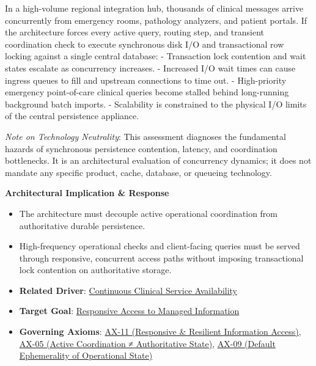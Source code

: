 In a high-volume regional integration hub, thousands of clinical messages arrive concurrently from emergency rooms, pathology analyzers, and patient portals. If the architecture forces every active query, routing step, and transient coordination check to execute synchronous disk I/O and transactional row locking against a single central database:
- Transaction lock contention and wait states escalate as concurrency increases.
- Increased I/O wait times can cause ingress queues to fill and upstream connections to time out.
- High-priority emergency point-of-care clinical queries become stalled behind long-running background batch imports.
- Scalability is constrained to the physical I/O limits of the central persistence appliance.



\emph{Note on Technology Neutrality}: This assessment diagnoses the fundamental hazards of synchronous persistence contention, latency, and coordination bottlenecks. It is an architectural evaluation of concurrency dynamics; it does not mandate any specific product, cache, database, or queueing technology.



\par\medskip\textbf{Architectural Implication \& Response}\par


\begin{itemize}


\item The architecture must decouple active operational coordination from authoritative durable persistence.

\item High-frequency operational checks and client-facing queries must be served through responsive, concurrent access paths without imposing transactional lock contention on authoritative storage.

\item \textbf{Related Driver}: \href{\detokenize{../../../../../docs/markdown/01-motivation/drivers-assessments/drivers.md}}{Continuous Clinical Service Availability}

\item \textbf{Target Goal}: \href{\detokenize{../../../../../docs/markdown/01-motivation/goals-outcomes/strategic-goals.md}}{Responsive Access to Managed Information}

\item \textbf{Governing Axioms}: \hyperref[element:8a1e995f16954484a78ae1c5c114d546]{AX-11 (Responsive \& Resilient Information Access)}, \hyperref[element:0412a2084f0145babc4f022c71fea65f]{AX-05 (Active Coordination ≠ Authoritative State)}, \hyperref[element:9a5cb9e8876844e58e660f909f7df9fc]{AX-09 (Default Ephemerality of Operational State)}

\end{itemize}

